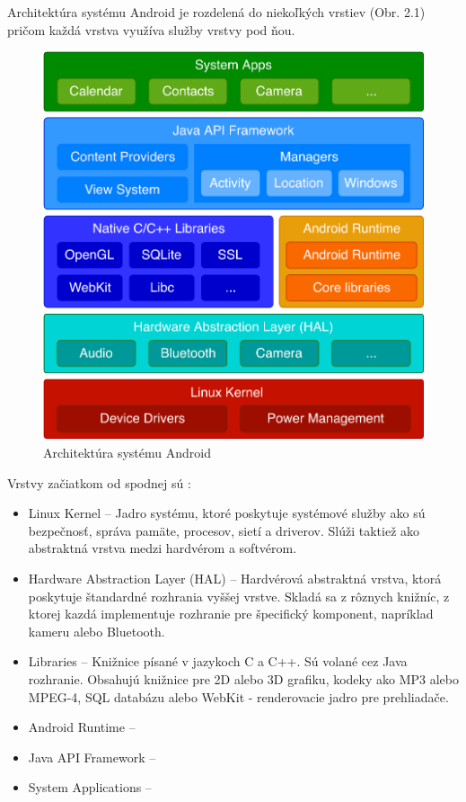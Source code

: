 \documentclass{template/socthesis}
\begin{document}
Architektúra systému Android je rozdelená do niekoľkých vrstiev (Obr. 2.1) pričom každá vrstva využíva služby vrstvy pod ňou. 
\begin{center}
	\begin{figure}[htp]
		\caption{Architektúra systému Android}
		\centering
		\includegraphics[scale=0.60]{android_architecture}
	\end{figure}
\end{center}

Vrstvy začiatkom od spodnej sú \cite{gandhewar2010google}:
\begin{itemize}
	\item Linux Kernel -- Jadro systému, ktoré poskytuje systémové služby ako sú bezpečnosť, správa pamäte, procesov, sietí a driverov. Slúži taktiež ako abstraktná vrstva medzi hardvérom a softvérom.  
	\item Hardware Abstraction Layer (HAL) -- Hardvérová abstraktná vrstva, ktorá poskytuje štandardné rozhrania vyššej vrstve. Skladá sa z rôznych knižníc, z ktorej kazdá implementuje rozhranie pre špecifický komponent, napríklad kameru alebo Bluetooth.
	\item Libraries -- Knižnice písané v jazykoch C a C++. Sú volané cez Java rozhranie. Obsahujú knižnice pre 2D alebo 3D grafiku, kodeky ako MP3 alebo MPEG-4, SQL databázu alebo WebKit - renderovacie jadro pre prehliadače. 
	\item Android Runtime --
	\item Java API Framework --
	\item System Applications --
\end{itemize}
\newpage

\printbibliography[title=Zoznam použitej literatúry]
\end{document}
